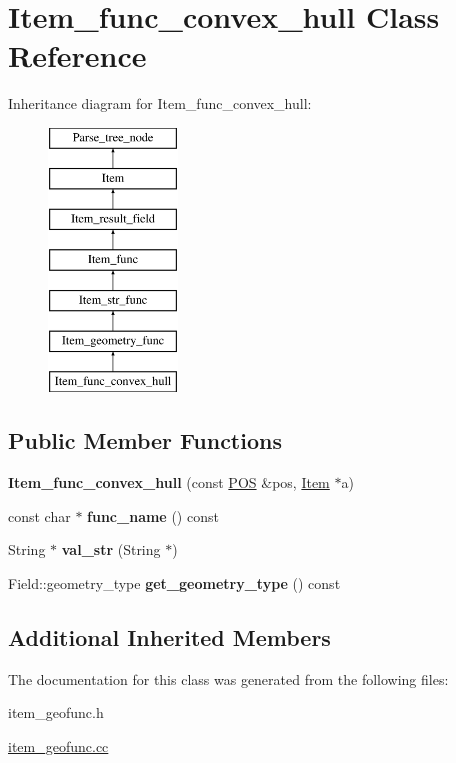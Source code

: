 \hypertarget{classItem__func__convex__hull}{}\section{Item\+\_\+func\+\_\+convex\+\_\+hull Class Reference}
\label{classItem__func__convex__hull}
Inheritance diagram for Item\+\_\+func\+\_\+convex\+\_\+hull\+:\begin{figure}[H]
\begin{center}
\leavevmode
\includegraphics[height=7.000000cm]{classItem__func__convex__hull}
\end{center}
\end{figure}
\subsection*{Public Member Functions}
\begin{DoxyCompactItemize}
\item 
\mbox{\label{classItem__func__convex__hull_af5a90b38dd4481be189393406e110f1f}} 
{\bfseries Item\+\_\+func\+\_\+convex\+\_\+hull} (const \mbox{\hyperlink{structYYLTYPE}{P\+OS}} \&pos, \mbox{\hyperlink{classItem}{Item}} $\ast$a)
\item 
\mbox{\label{classItem__func__convex__hull_a869d1631ea0cac34c87e51eb90785f90}} 
const char $\ast$ {\bfseries func\+\_\+name} () const
\item 
\mbox{\label{classItem__func__convex__hull_a477cbe3bf977b39bd3b76ae8240aa51f}} 
String $\ast$ {\bfseries val\+\_\+str} (String $\ast$)
\item 
\mbox{\label{classItem__func__convex__hull_a0f5b9cd47e91dde1cbaf705624bb37c7}} 
Field\+::geometry\+\_\+type {\bfseries get\+\_\+geometry\+\_\+type} () const
\end{DoxyCompactItemize}
\subsection*{Additional Inherited Members}


The documentation for this class was generated from the following files\+:\begin{DoxyCompactItemize}
\item 
item\+\_\+geofunc.\+h\item 
\mbox{\hyperlink{item__geofunc_8cc}{item\+\_\+geofunc.\+cc}}\end{DoxyCompactItemize}
